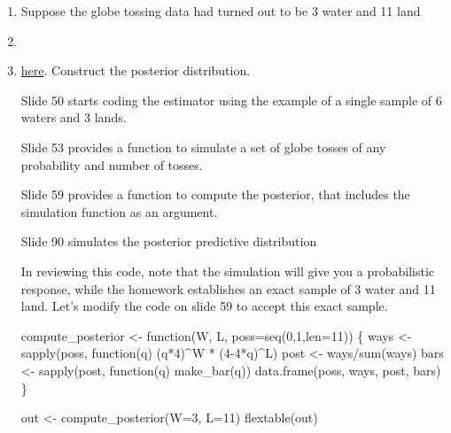 \documentclass[
  letterpaper,
  DIV=11,
  numbers=noendperiod,
  oneside]{scrartcl}
\newenvironment{Shaded}{\begin{snugshade}}{\end{snugshade}}
\newcommand{\AttributeTok}[1]{\textcolor[rgb]{0.40,0.45,0.13}{#1}}
\newcommand{\ControlFlowTok}[1]{\textcolor[rgb]{0.00,0.23,0.31}{#1}}
\newcommand{\DecValTok}[1]{\textcolor[rgb]{0.68,0.00,0.00}{#1}}
\newcommand{\FunctionTok}[1]{\textcolor[rgb]{0.28,0.35,0.67}{#1}}
\newcommand{\NormalTok}[1]{\textcolor[rgb]{0.00,0.23,0.31}{#1}}
\newcommand{\OtherTok}[1]{\textcolor[rgb]{0.00,0.23,0.31}{#1}}
\newcommand{\SpecialCharTok}[1]{\textcolor[rgb]{0.37,0.37,0.37}{#1}}
\begin{document}
\begin{enumerate}
\def\labelenumi{\arabic{enumi}.}
\item
  Suppose the globe tossing data had turned out to be 3 water and 11
  land
\item
\item
  \href{https://www.coursera.org/learn/bayesian/lecture/cOdqz/inference-for-a-proportion-bayesian-approach}{here}.
  Construct the posterior distribution.

  Slide 50 starts coding the estimator using the example of a single
  sample of 6 waters and 3 lands.

  Slide 53 provides a function to simulate a set of globe tosses of any
  probability and number of tosses.

  Slide 59 provides a function to compute the posterior, that includes
  the simulation function as an argument.

  Slide 90 simulates the posterior predictive distribution

  In reviewing this code, note that the simulation will give you a
  probabilistic response, while the homework establishes an exact sample
  of 3 water and 11 land. Let's modify the code on slide 59 to accept
  this exact sample.

\begin{Shaded}
\begin{Highlighting}[]
\NormalTok{compute\_posterior }\OtherTok{\textless{}{-}} \ControlFlowTok{function}\NormalTok{(W, L,}
                              \AttributeTok{poss=}\FunctionTok{seq}\NormalTok{(}\DecValTok{0}\NormalTok{,}\DecValTok{1}\NormalTok{,}\AttributeTok{len=}\DecValTok{11}\NormalTok{)) \{}
\NormalTok{  ways }\OtherTok{\textless{}{-}} \FunctionTok{sapply}\NormalTok{(poss, }\ControlFlowTok{function}\NormalTok{(q) (q}\SpecialCharTok{*}\DecValTok{4}\NormalTok{)}\SpecialCharTok{\^{}}\NormalTok{W }\SpecialCharTok{*}\NormalTok{ (}\DecValTok{4{-}4}\SpecialCharTok{*}\NormalTok{q)}\SpecialCharTok{\^{}}\NormalTok{L)}
\NormalTok{  post }\OtherTok{\textless{}{-}}\NormalTok{ ways}\SpecialCharTok{/}\FunctionTok{sum}\NormalTok{(ways)}
\NormalTok{  bars }\OtherTok{\textless{}{-}} \FunctionTok{sapply}\NormalTok{(post, }\ControlFlowTok{function}\NormalTok{(q) }\FunctionTok{make\_bar}\NormalTok{(q))}
  \FunctionTok{data.frame}\NormalTok{(poss, ways, post, bars)}
\NormalTok{\}  }

\NormalTok{out }\OtherTok{\textless{}{-}} \FunctionTok{compute\_posterior}\NormalTok{(}\AttributeTok{W=}\DecValTok{3}\NormalTok{,}
                  \AttributeTok{L=}\DecValTok{11}\NormalTok{)}
\FunctionTok{flextable}\NormalTok{(out)}
\end{Highlighting}
\end{Shaded}


\end{enumerate}
\end{document}
